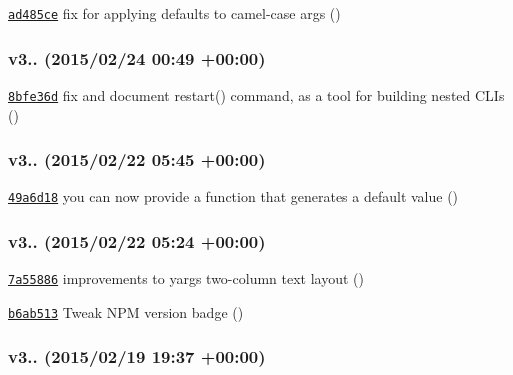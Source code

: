 \begin{DoxyItemize}
\item \href{https://github.com/bcoe/yargs/commit/ad485ce748ebdfce25b88ef9d6e83d97a2f68987}{\tt ad485ce} fix for applying defaults to camel-\/case args ()
\end{DoxyItemize}

\subsubsection*{v3.. (2015/02/24 00\+:49 +00\+:00)}


\begin{DoxyItemize}
\item \href{https://github.com/bcoe/yargs/commit/8bfe36d7fb0f93a799ea3f4c756a7467c320f8c0}{\tt 8bfe36d} fix and document restart() command, as a tool for building nested C\+L\+Is ()
\end{DoxyItemize}

\subsubsection*{v3.. (2015/02/22 05\+:45 +00\+:00)}


\begin{DoxyItemize}
\item \href{https://github.com/bcoe/yargs/commit/49a6d1822a4ef9b1ea6f90cc366be60912628885}{\tt 49a6d18} you can now provide a function that generates a default value ()
\end{DoxyItemize}

\subsubsection*{v3.. (2015/02/22 05\+:24 +00\+:00)}


\begin{DoxyItemize}
\item \href{https://github.com/bcoe/yargs/commit/7a55886c9343cf71a20744ca5cdd56d2ea7412d5}{\tt 7a55886} improvements to yargs two-\/column text layout ()
\item \href{https://github.com/bcoe/yargs/commit/b6ab5136a4c3fa6aa496f6b6360382e403183989}{\tt b6ab513} Tweak N\+PM version badge ()
\end{DoxyItemize}

\subsubsection*{v3.. (2015/02/19 19\+:37 +00\+:00)}


